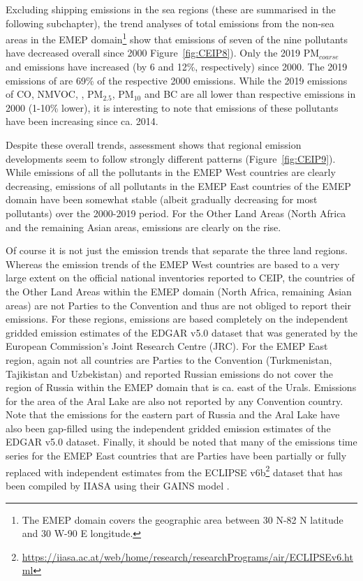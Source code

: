 Excluding shipping emissions in the sea regions (these are summarised in the following subchapter), the trend analyses of total emissions from the non-sea areas in the EMEP domain\footnote{The EMEP domain covers the geographic area between 30{\degrees} N-82{\degrees} N latitude and 30{\degrees} 
  W-90{\degrees} E longitude.} show that emissions of seven of the nine pollutants have decreased overall since 2000 Figure~\ref{fig:CEIP8}). Only the 2019 PM$_{coarse}$  and \nhiii emissions have increased (by 6 and 12\%, respectively) since 2000. The 2019 emissions of \sox are 69\% of the respective 2000 emissions. While the 2019 emissions of CO, NMVOC, \nox, PM$_{2.5}$, PM$_{10}$ and BC are all lower than respective emissions in 2000 (1-10\% lower), it is interesting to note that emissions of these pollutants have been increasing since ca. 2014.

Despite these overall trends, assessment shows that regional emission developments seem to follow strongly different patterns (Figure~\ref{fig:CEIP9}). While emissions of all the pollutants in the EMEP West countries are clearly decreasing, emissions of all pollutants in the EMEP East countries of the EMEP domain have been somewhat stable (albeit gradually decreasing for most pollutants) over the 2000-2019 period. For the Other Land Areas (North Africa and the remaining Asian areas, emissions are clearly on the rise.

Of course it is not just the emission trends that separate the three land regions. Whereas the emission trends of the EMEP West countries are based to a very large extent on the official national inventories reported to CEIP, the countries of the Other Land Areas within the EMEP domain (North Africa, remaining Asian areas) are not Parties to the Convention and thus are not obliged to report their emissions. For these regions, emissions are based completely on the independent gridded emission estimates of the EDGAR v5.0 dataset \citep{EDGARv50} that was generated by the European Commission's Joint Research Centre (JRC). For the EMEP East region, again not all countries are Parties to the Convention (Turkmenistan, Tajikistan and Uzbekistan) and reported Russian emissions do not cover the region of Russia within the EMEP domain that is ca. east of the Urals. Emissions for the area of the Aral Lake are also not reported by any Convention country. Note that the emissions for the eastern part of Russia and the Aral Lake have also been gap-filled using the independent gridded emission estimates of the EDGAR v5.0 dataset. Finally, it should be noted that many of the emissions time series for the EMEP East countries that are Parties have been partially or fully replaced with independent estimates from the ECLIPSE v6b\footnote{\url{https://iiasa.ac.at/web/home/research/researchPrograms/air/ECLIPSEv6.html}} dataset that has been compiled by IIASA using their GAINS model  \citep{Amann_et_al:2011}.


